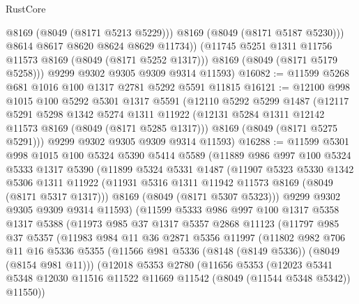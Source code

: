 \begin{lexlean}{RustCore}
\begin{coremodule}
                @8169
                (@8049 (@8171 @5213 @5229)))
              @8169
              (@8049 (@8171 @5187 @5230)))
            @8614
            @8617
            @8620
            @8624
            @8629
            @11734))
        (@11745 @5251 @1311 @11756 @11573 @8169 (@8049 (@8171 @5252 @1317)))
        @8169
        (@8049 (@8171 @5179 @5258)))
      @9299
      @9302
      @9305
      @9309
      @9314
      @11593)
@16082 := @11599 @5268 @681 @1016 @100 @1317 @2781 @5292 @5591 @11815
@16121 := @12100
    @998
    @1015
    @100
    @5292
    @5301
    @1317
    @5591
    (@12110
      @5292
      @5299
      @1487
      (@12117
        @5291
        @5298
        @1342
        @5274
        @1311
        @11922
        (@12131 @5284 @1311 @12142 @11573 @8169 (@8049 (@8171 @5285 @1317)))
        @8169
        (@8049 (@8171 @5275 @5291)))
      @9299
      @9302
      @9305
      @9309
      @9314
      @11593)
@16288 := @11599
    @5301
    @998
    @1015
    @100
    @5324
    @5390
    @5414
    @5589
    (@11889
      @986
      @997
      @100
      @5324
      @5333
      @1317
      @5390
      (@11899
        @5324
        @5331
        @1487
        (@11907
          @5323
          @5330
          @1342
          @5306
          @1311
          @11922
          (@11931 @5316 @1311 @11942 @11573 @8169 (@8049 (@8171 @5317 @1317)))
          @8169
          (@8049 (@8171 @5307 @5323)))
        @9299
        @9302
        @9305
        @9309
        @9314
        @11593)
      (@11599
        @5333
        @986
        @997
        @100
        @1317
        @5358
        @1317
        @5388
        (@11973
          @985
          @37
          @1317
          @5357
          @2868
          @11123
          (@11797
            @985
            @37
            @5357
            (@11983
              @984
              @11
              @36
              @2871
              @5356
              @11997
              (@11802
                @982
                @706
                @11
                @16
                @5336
                @5355
                (@11566 @981 @5336 (@8148 (@8149 @5336)) (@8049 (@8154 @981 @11)))
                (@12018
                  @5353
                  @2780
                  (@11656
                    @5353
                    (@12023
                      @5341
                      @5348
                      @12030
                      @11516
                      @11522
                      @11669
                      @11542
                      (@8049 (@11544 @5348 @5342))
                      @11550))

\end{coremodule}
\end{lexlean}
